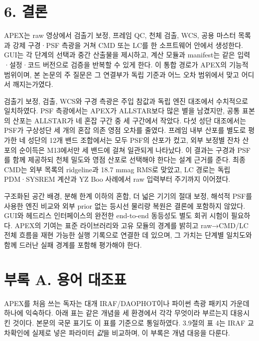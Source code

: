 \section{6. 결론}

APEX는 raw 영상에서 검출기 보정, 프레임 QC, 천체 검출, WCS, 공용 마스터 목록과 강제 구경·PSF 측광을 거쳐 CMD 또는 LC를 한 소프트웨어 안에서 생성한다. GUI는 각 단계의 선택과 중간 산출물을 제시하고, 계산 모듈과 manifest는 같은 입력·설정·코드 버전으로 검증을 반복할 수 있게 한다. 이 통합 경로가 APEX의 기능적 범위이며, 본 논문의 주 질문은 그 연결부가 독립 기준과 어느 오차 범위에서 맞고 어디서 깨지는가였다.



검출기 보정, 검출, WCS와 구경 측광은 주입 참값과 독립 엔진 대조에서 수치적으로 일치하였다. PSF 측광에서는 APEX가 ALLSTAR보다 많은 별을 남겼지만, 공통 표본의 산포는 ALLSTAR가 네 혼잡 구간 중 세 구간에서 작았다. 다섯 성단 대조에서는 PSF가 구상성단 세 개의 혼잡 의존 영점 오차를 줄였다. 프레임 내부 산포를 별도로 평가한 네 성단의 12개 밴드 조합에서는 모두 PSF의 산포가 컸고, 외부 보정별 잔차 산포의 순이득은 M13에서만 세 밴드에 걸쳐 일관되게 나타났다. 이 결과는 구경과 PSF를 함께 제공하되 천체 밀도와 영점 산포로 선택해야 한다는 설계 근거를 준다. 최종 CMD는 외부 목록의 ridgeline과 18.7 mmag RMS로 맞았고, LC 경로는 독립 PDM·SYSREM 계산과 YZ Boo 사례에서 raw 입력부터 주기까지 이어졌다.



구조화된 공간 배경, 분해 한계 이하의 혼합, 더 넓은 기기의 절대 보정, 해석적 PSF를 사용한 엔진 비교와 외부 prior 없는 등시선 물리량 복원은 결론에 포함하지 않았다. GUI와 헤드리스 인터페이스의 완전한 end-to-end 동등성도 별도 회귀 시험이 필요하다. APEX의 기여는 표준 라이브러리와 고유 모듈의 경계를 밝히고 raw→CMD/LC 전체 흐름을 재현 가능한 실행 기록으로 연결한 데 있으며, 그 가치는 단계별 일치도와 함께 드러난 실패 경계를 포함해 평가해야 한다.



\section{부록 A. 용어 대조표}

APEX를 처음 쓰는 독자는 대개 IRAF/DAOPHOT이나 파이썬 측광 패키지 가운데 하나에 익숙하다. 아래 표는 같은 개념을 세 환경에서 각각 무엇이라 부르는지 대응시킨 것이다. 본문의 국문 표기도 이 표를 기준으로 통일하였다. 3.9절의 표 4는 IRAF 교차확인에 실제로 넣은 파라미터 \emph{값}을 비교하며, 이 부록은 개념 대응을 다룬다.



